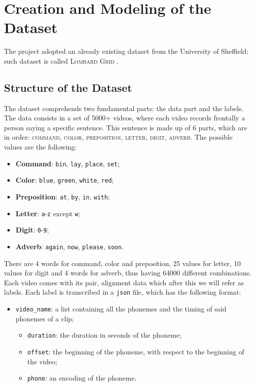 \documentclass[11pt,journal]{IEEEtran}
\newcommand{\nl}{

\medskip

}
\begin{document}
\section{Creation and Modeling of the Dataset}

The project adopted an already existing dataset from the University of Sheffield: such dataset is called \textsc{Lombard Grid} \cite{gunileo:dataset}.

\subsection{Structure of the Dataset}

The dataset comprehends two fundamental parts: the data part and the labels. The data consists in a set of 5000+ videos, where each video records frontally a person saying a specific sentence. This sentence is made up of 6 parts, which are in order: \textsc{command}, \textsc{color}, \textsc{preposition}, \textsc{letter}, \textsc{digit}, \textsc{adverb}. The possible values are the following:
\begin{itemize}
    \item \textbf{Command}: \texttt{bin}, \texttt{lay}, \texttt{place}, \texttt{set};
    \item \textbf{Color}: \texttt{blue}, \texttt{green}, \texttt{white}, \texttt{red};
    \item \textbf{Preposition}: \texttt{at}, \texttt{by}, \texttt{in}, \texttt{with};
    \item \textbf{Letter}: \texttt{a}-\texttt{z} except \texttt{w};
    \item \textbf{Digit}: \texttt{0}-\texttt{9};
    \item \textbf{Adverb}: \texttt{again}, \texttt{now}, \texttt{please}, \texttt{soon}.
\end{itemize}

\nl
There are 4 words for command, color and preposition, 25 values for letter, 10 values for digit and 4 words for adverb, thus having 64000 different combinations. Each video comes with its pair, alignment data which after this we will refer as labels. Each label is transcribed in a \texttt{json} file, which has the following format:

\begin{itemize}
    \item \texttt{video\_name}: a list containing all the phonemes and the timing of said phonemes of a clip;
    \begin{itemize}
        \item \texttt{duration}: the duration in seconds of the phoneme;
        \item \texttt{offset}: the beginning of the phoneme, with respect to the beginning of the video;
        \item \texttt{phone}: an encoding of the phoneme.
    \end{itemize}
\end{itemize}
\end{document}
